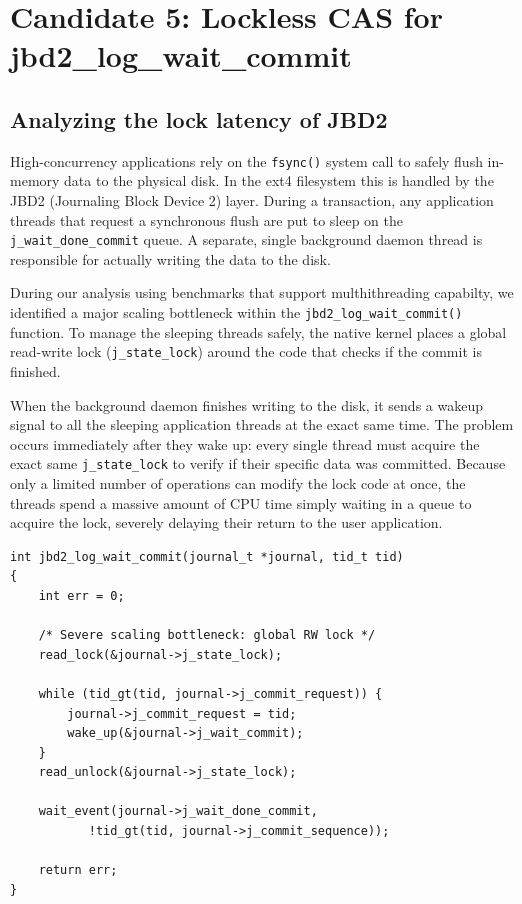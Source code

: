 \documentclass[12pt,a4paper]{article}
\begin{document}
\section{Candidate 5: Lockless CAS for jbd2\_log\_wait\_commit}


\subsection{Analyzing the lock latency of JBD2}

High-concurrency applications rely on the \texttt{fsync()} system
call to safely flush in-memory data to the physical disk. In the
ext4 filesystem this is handled by the JBD2 (Journaling Block
Device 2) layer. During a transaction, any application threads
that request a synchronous flush are put to sleep on the
\texttt{j\_wait\_done\_commit} queue. A separate, single
background daemon thread is responsible for actually writing the
data to the disk.

During our analysis using benchmarks that support multhithreading capabilty, we identified a major
scaling bottleneck within the \texttt{jbd2\_log\_wait\_commit()}
function. To manage the sleeping threads safely, the native kernel
places a global read-write lock (\texttt{j\_state\_lock}) around
the code that checks if the commit is finished.

When the background daemon finishes writing to the disk, it sends
a wakeup signal to all the sleeping application threads at the
exact same time. The problem occurs immediately after they wake
up: every single thread must acquire the exact same
\texttt{j\_state\_lock} to verify if their specific data was
committed. Because only a limited number of operations can modify
the lock code at once, the threads spend a massive amount of CPU
time simply waiting in a queue to acquire the lock, severely
delaying their return to the user application.

\begin{lstlisting}[caption={The Native ext4 Implementation (Problematic)}]
int jbd2_log_wait_commit(journal_t *journal, tid_t tid)
{
    int err = 0;

    /* Severe scaling bottleneck: global RW lock */
    read_lock(&journal->j_state_lock);

    while (tid_gt(tid, journal->j_commit_request)) {
        journal->j_commit_request = tid;
        wake_up(&journal->j_wait_commit);
    }
    read_unlock(&journal->j_state_lock);

    wait_event(journal->j_wait_done_commit,
           !tid_gt(tid, journal->j_commit_sequence));

    return err;
}
\end{lstlisting}
\end{document}
